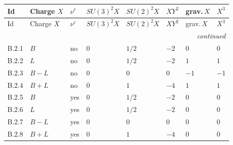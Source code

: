 {\scriptsize\setlength{\tabcolsep}{3pt}
\begin{longtable}{@{}llllllll@{}}
\toprule
Id & Charge $X$ & $\nu^c$ & $SU(3)^2X$ & $SU(2)^2X$ & $XY^2$ & grav.$\,X$ & $X^3$ \\
\midrule\endfirsthead
\toprule
Id & Charge $X$ & $\nu^c$ & $SU(3)^2X$ & $SU(2)^2X$ & $XY^2$ & grav.$\,X$ & $X^3$ \\
\midrule\endhead
\midrule\multicolumn{8}{r}{\emph{continued}}\\\endfoot
\bottomrule\endlastfoot
B.2.1 & $B$ & no & $0$ & $1/2$ & $-2$ & $0$ & $0$ \\
B.2.2 & $L$ & no & $0$ & $1/2$ & $-2$ & $1$ & $1$ \\
B.2.3 & $B-L$ & no & $0$ & $0$ & $0$ & $-1$ & $-1$ \\
B.2.4 & $B+L$ & no & $0$ & $1$ & $-4$ & $1$ & $1$ \\
B.2.5 & $B$ & yes & $0$ & $1/2$ & $-2$ & $0$ & $0$ \\
B.2.6 & $L$ & yes & $0$ & $1/2$ & $-2$ & $0$ & $0$ \\
B.2.7 & $B-L$ & yes & $0$ & $0$ & $0$ & $0$ & $0$ \\
B.2.8 & $B+L$ & yes & $0$ & $1$ & $-4$ & $0$ & $0$ \\
\end{longtable}}
